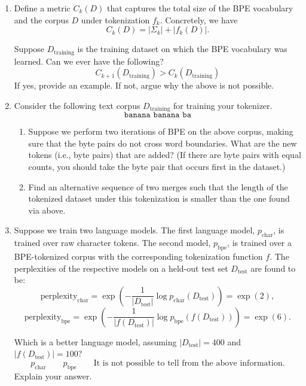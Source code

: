 \documentclass[10pt]{article}
\begin{document}
\begin{enumerate}
\item[(a)] [2 points] Define a metric \(C_k(D)\) that captures the total size of the BPE vocabulary and the
corpus \(D\) under tokenization \(f_k\). Concretely, we have
\[
C_k(D)=|\Sigma_k|+|f_k(D)|.
\]

Suppose \(D_{\mathrm{training}}\) is the training dataset on which the BPE vocabulary was learned. Can we
ever have the following?
\[
C_{k+1}(D_{\mathrm{training}}) > C_k(D_{\mathrm{training}})
\]
If yes, provide an example. If not, argue why the above is not possible.

\item[(b)] [2 points] Consider the following text corpus \(D_{\mathrm{training}}\) for training your tokenizer.
\[
\texttt{banana banana ba}
\]

\begin{enumerate}
\item[(i)] Suppose we perform two iterations of BPE on the above corpus, making sure that the
byte pairs do not cross word boundaries. What are the new tokens (i.e., byte pairs) that
are added? (If there are byte pairs with equal counts, you should take the byte pair that
occurs first in the dataset.)
\item[(ii)] Find an alternative sequence of two merges such that the length of the tokenized dataset
under this tokenization is smaller than the one found via above.
\end{enumerate}

\item[(c)] [2 points] Suppose we train two language models. The first language model, \(p_{\mathrm{char}}\), is trained
over raw character tokens. The second model, \(p_{\mathrm{bpe}}\), is trained over a BPE-tokenized corpus
with the corresponding tokenization function \(f\). The perplexities of the respective models on
a held-out test set \(D_{\mathrm{test}}\) are found to be:
\[
\mathrm{perplexity}_{\mathrm{char}}
=
\exp\left(
-\frac{1}{|D_{\mathrm{test}}|}\log p_{\mathrm{char}}(D_{\mathrm{test}})
\right)
=
\exp(2),
\]
\[
\mathrm{perplexity}_{\mathrm{bpe}}
=
\exp\left(
-\frac{1}{|f(D_{\mathrm{test}})|}\log p_{\mathrm{bpe}}(f(D_{\mathrm{test}}))
\right)
=
\exp(6).
\]

Which is a better language model, assuming \(|D_{\mathrm{test}}| = 400\) and \(|f(D_{\mathrm{test}})| = 100\)?
\[
p_{\mathrm{char}}
\qquad
p_{\mathrm{bpe}}
\qquad
\text{It is not possible to tell from the above information.}
\]
Explain your answer.
\end{enumerate}
\end{document}
